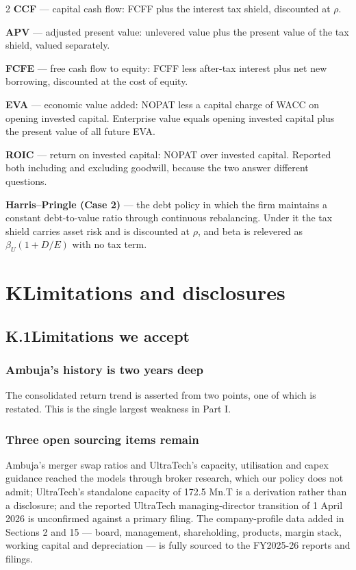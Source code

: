 \begin{paracol}{2}
\textbf{CCF} --- capital cash flow: FCFF plus the interest tax shield, discounted at
$\rho$.

\textbf{APV} --- adjusted present value: unlevered value plus the present value of the
tax shield, valued separately.

\textbf{FCFE} --- free cash flow to equity: FCFF less after-tax interest plus net new
borrowing, discounted at the cost of equity.

\textbf{EVA} --- economic value added: NOPAT less a capital charge of WACC on opening
invested capital. Enterprise value equals opening invested capital plus the present
value of all future EVA.

\textbf{ROIC} --- return on invested capital: NOPAT over invested capital. Reported
both including and excluding goodwill, because the two answer different questions.

\textbf{Harris--Pringle (Case 2)} --- the debt policy in which the firm maintains a
constant debt-to-value ratio through continuous rebalancing. Under it the tax shield
carries asset risk and is discounted at $\rho$, and beta is relevered as
$\beta_U(1+D/E)$ with no tax term.

\switchcolumn
\section*{K\quad Limitations and disclosures}

\subsection*{K.1\quad Limitations we accept}

\subsubsection{Ambuja's history is two years deep} The consolidated return trend is
asserted from two points, one of which is restated. This is the single largest
weakness in Part I.

\subsubsection{Three open sourcing items remain} Ambuja's merger swap ratios and
UltraTech's capacity, utilisation and capex guidance reached the models through broker
research, which our policy does not admit; UltraTech's standalone capacity of 172.5
Mn.T is a derivation rather than a disclosure; and the reported UltraTech
managing-director transition of 1 April 2026 is unconfirmed against a primary filing.
The company-profile data added in Sections 2 and 15 — board, management, shareholding,
products, margin stack, working capital and depreciation — is fully sourced to the
FY2025-26 reports and filings.


\end{paracol}
